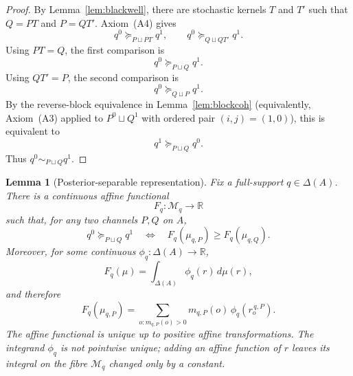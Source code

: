 \documentclass[11pt,a4paper]{article}
\newtheorem{lemma}[theorem]{Lemma}
\theoremstyle{definition}
\newcommand{\R}{\mathbb R}
\newcommand{\1}{\mathbf 1}
\begin{document}
\begin{proof}
By Lemma~\ref{lem:blackwell}, there are stochastic kernels $T$ and $T'$ such that $Q=PT$ and $P=QT'$.  Axiom~\textup{(A4)}
gives
\[
q^0\succeq_{P\sqcup PT}q^1,
\qquad
q^0\succeq_{Q\sqcup QT'}q^1.
\]
Using $PT=Q$, the first comparison is
\[
q^0\succeq_{P\sqcup Q}q^1.
\]
Using $QT'=P$, the second comparison is
\[
q^0\succeq_{Q\sqcup P}q^1.
\]
By the reverse-block equivalence in Lemma~\ref{lem:blockcoh} (equivalently, Axiom~\textup{(A3)} applied to
$P^0\sqcup Q^1$ with ordered pair $(i,j)=(1,0)$), this is equivalent to
\[
q^1\succeq_{P\sqcup Q}q^0.
\]
Thus $q^0\sim_{P\sqcup Q}q^1$.
\end{proof}

\begin{lemma}[Posterior-separable representation]\label{lem:postsep}
Fix a full-support $q\in\Delta(A)$.  There is a continuous affine functional
\[
F_q:\mathcal M_q\to\R
\]
such that, for any two channels $P,Q$ on $A$,
\[
q^0\succeq_{P\sqcup Q}q^1
\quad\Longleftrightarrow\quad
F_q(\mu_{q,P})\ge F_q(\mu_{q,Q}).
\]
Moreover, for some continuous $\phi_q:\Delta(A)\to\R$,
\[
F_q(\mu)=\int_{\Delta(A)}\phi_q(r)\,d\mu(r),
\]
and therefore
\[
F_q(\mu_{q,P})
=
\sum_{o:m_{q,P}(o)>0}m_{q,P}(o)\,\phi_q(r_o^{\,q,P}).
\]
The affine functional is unique up to positive affine transformations.  The integrand $\phi_q$ is not pointwise unique;
adding an affine function of $r$ leaves its integral on the fibre $\mathcal M_q$ changed only by a constant.
\end{lemma}
\end{document}
